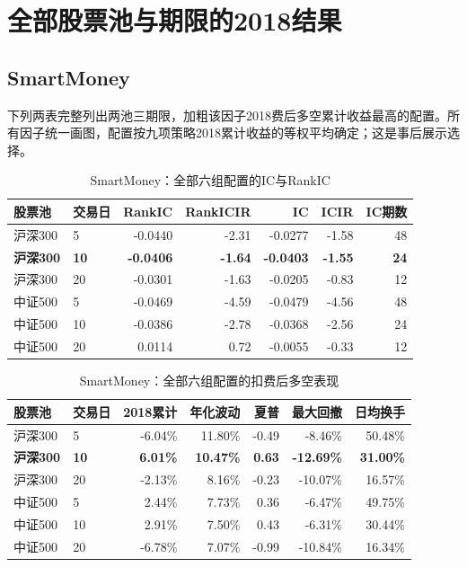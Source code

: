 \clearpage
\section{全部股票池与期限的2018结果}
\subsection{SmartMoney}
下列两表完整列出两池三期限，加粗该因子2018费后多空累计收益最高的配置。所有因子统一画图，配置按九项策略2018累计收益的等权平均确定；这是事后展示选择。
\begin{table}[H]\centering\normalsize\setlength{\tabcolsep}{3.5pt}
\caption{SmartMoney：全部六组配置的IC与RankIC}\begin{tabular}{llrrrrr}\toprule
股票池 & 交易日 & RankIC & RankICIR & IC & ICIR & IC期数\\\midrule
沪深300 & 5 & -0.0440 & -2.31 & -0.0277 & -1.58 & 48 \\
\textbf{沪深300} & \textbf{10} & \textbf{-0.0406} & \textbf{-1.64} & \textbf{-0.0403} & \textbf{-1.55} & \textbf{24} \\
沪深300 & 20 & -0.0301 & -1.63 & -0.0205 & -0.83 & 12 \\
中证500 & 5 & -0.0469 & -4.59 & -0.0479 & -4.56 & 48 \\
中证500 & 10 & -0.0386 & -2.78 & -0.0368 & -2.56 & 24 \\
中证500 & 20 & 0.0114 & 0.72 & -0.0055 & -0.33 & 12 \\
\bottomrule\end{tabular}\end{table}
\begin{table}[H]\centering\normalsize\setlength{\tabcolsep}{3.5pt}
\caption{SmartMoney：全部六组配置的扣费后多空表现}\begin{tabular}{llrrrrr}\toprule
股票池 & 交易日 & 2018累计 & 年化波动 & 夏普 & 最大回撤 & 日均换手\\\midrule
沪深300 & 5 & -6.04\% & 11.80\% & -0.49 & -8.46\% & 50.48\% \\
\textbf{沪深300} & \textbf{10} & \textbf{6.01\%} & \textbf{10.47\%} & \textbf{0.63} & \textbf{-12.69\%} & \textbf{31.00\%} \\
沪深300 & 20 & -2.13\% & 8.16\% & -0.23 & -10.07\% & 16.57\% \\
中证500 & 5 & 2.44\% & 7.73\% & 0.36 & -6.47\% & 49.75\% \\
中证500 & 10 & 2.91\% & 7.50\% & 0.43 & -6.31\% & 30.44\% \\
中证500 & 20 & -6.78\% & 7.07\% & -0.99 & -10.84\% & 16.34\% \\
\bottomrule\end{tabular}\end{table}
\clearpage
{}
\clearpage
